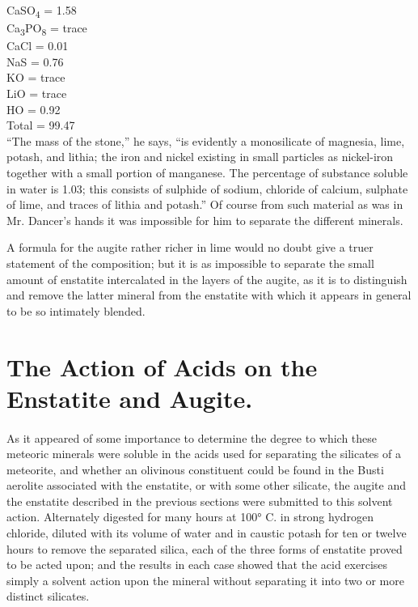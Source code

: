 \documentclass[a4paper, 12pt, oneside]{article}
\begin{document}
{\hspace*{20mm}CaSO\textsubscript{4} = 1.58\\
\hspace*{20mm}Ca\textsubscript{3}PO\textsubscript{8} = trace\\
\hspace*{20mm}CaCl = 0.01\\
\hspace*{20mm}NaS = 0.76\\
\hspace*{20mm}KO = trace\\
\hspace*{20mm}LiO = trace\\
\hspace*{20mm}HO = 0.92\\
\hspace*{25mm}Total = 99.47\\
``The mass of the stone,'' he says, ``is evidently a monosilicate of magnesia, lime, potash, and lithia; the iron and nickel existing in small particles as nickel-iron together with a small portion of manganese. The percentage of substance soluble in water is 1.03; this consists of sulphide of sodium, chloride of calcium, sulphate of lime, and traces of lithia and potash.'' Of course from such material as was in Mr. Dancer's hands it was impossible for him to separate the different minerals.}

A formula for the augite rather richer in lime would no doubt give a truer statement of the composition; but it is as impossible to separate the small amount of enstatite intercalated in the layers of the augite, as it is to distinguish and remove the latter mineral from the enstatite with which it appears in general to be so intimately blended.
\clearpage
\section{The Action of Acids on the Enstatite and Augite.}
\paragraph{}
As it appeared of some importance to determine the degree to which these meteoric minerals were soluble in the acids used for separating the silicates of a meteorite, and whether an olivinous constituent could be found in the Busti aerolite associated with the enstatite, or with some other silicate, the augite and the enstatite described in the previous sections were submitted to this solvent action. Alternately digested for many hours at 100° C. in strong hydrogen chloride, diluted with its volume of water and in caustic potash for ten or twelve hours to remove the separated silica, each of the three forms of enstatite proved to be acted upon; and the results in each case showed that the acid exercises simply a solvent action upon the mineral without separating it into two or more distinct silicates.
\end{document}
